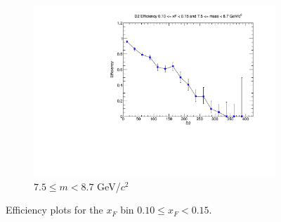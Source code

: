 \begin{figure}[p]
\begin{subfigure}[b]{0.32\textwidth}
        \includegraphics[width=\textwidth]{./kTrackerEfficiencyPlots/D2_Efficiency_xF2_mass10.pdf}
        \caption{$7.5 \leq m < 8.7$ GeV/$c^2$}
        \label{fig:xF2_mass10}
    \end{subfigure}
    \hfill
    \caption{Efficiency plots for the $x_F$ bin $0.10 \leq x_F < 0.15$.}
    \label{fig:xF2}
\end{figure}

\clearpage

